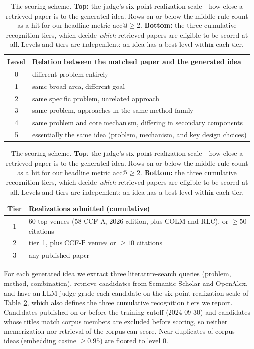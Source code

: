 \documentclass{article} %
\begin{document}
\begin{table}[t]
\caption{The scoring scheme. \textbf{Top:} the judge's six-point
realization scale---how close a retrieved paper is to the generated idea.
Rows on or below the middle rule count as a hit for our headline metric
acc@$\geq$2. \textbf{Bottom:} the three cumulative recognition tiers,
which decide \emph{which} retrieved papers are eligible to be scored at
all. Levels and tiers are independent: an idea has a best level within
each tier.}
\label{tab:rubric}
\begin{center}
\small
\begin{tabular}{@{}cl@{}}
\toprule
Level & Relation between the matched paper and the generated idea \\
\midrule
0 & different problem entirely \\
1 & same broad area, different goal \\
\midrule
2 & same specific problem, unrelated approach \\
3 & same problem, approaches in the same method family \\
4 & same problem and core mechanism, differing in secondary components \\
5 & essentially the same idea (problem, mechanism, and key design choices) \\
\bottomrule
\end{tabular}

\begin{tabular}{@{}cl@{}}
\toprule
Tier & Realizations admitted (cumulative) \\
\midrule
1 & 60 top venues (58 CCF-A, 2026 edition, plus COLM and RLC), or $\geq 50$ citations \\
2 & tier~1, plus CCF-B venues or $\geq 10$ citations \\
3 & any published paper \\
\bottomrule
\end{tabular}
\end{center}
\end{table}

For each generated idea we extract three literature-search queries
(problem, method, combination), retrieve candidates from Semantic Scholar
and OpenAlex, and have an LLM judge grade each candidate on the six-point
realization scale of Table~\ref{tab:rubric}, which also defines the three
cumulative recognition tiers we report. Candidates published on or before
the training cutoff (2024-09-30) and candidates whose titles match corpus
members are excluded before scoring, so neither memorization nor retrieval
of the corpus can score. Near-duplicates of corpus ideas (embedding cosine
$\geq 0.95$) are floored to level 0.
\end{document}
